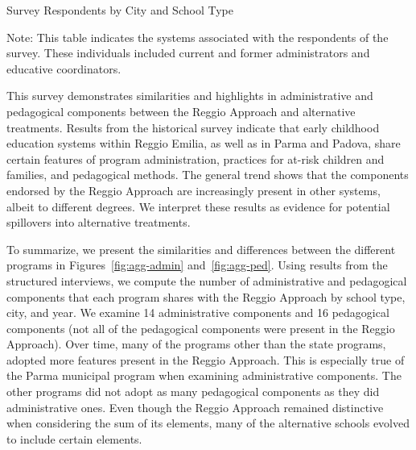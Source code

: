 \begin{table}[H]
\centering
\caption{Survey Respondents by City and School Type}\label{tab:respondents}
\begin{threeparttable}
	
\begin{tablenotes}
Note: This table indicates the systems associated with the respondents of the survey. These individuals included current and former administrators and educative coordinators.
\end{tablenotes}
\end{threeparttable}
\end{table}

This survey demonstrates similarities and highlights in administrative and pedagogical components between the Reggio Approach and alternative treatments. Results from the historical survey indicate that early childhood education systems within Reggio Emilia, as well as in Parma and Padova, share certain features of program administration, practices for at-risk children and families, and pedagogical methods. The general trend shows that the components endorsed by the Reggio Approach are increasingly present in other systems, albeit to different degrees. We interpret these results as evidence for potential spillovers into alternative treatments. 

To summarize, we present the similarities and differences between the different programs in Figures~\ref{fig:agg-admin} and~\ref{fig:agg-ped}. Using results from the structured interviews, we compute the number of administrative and pedagogical components that each program shares with the Reggio Approach by school type, city, and year. We examine 14 administrative components and 16 pedagogical components (not all of the pedagogical components were present in the Reggio Approach). Over time, many of the programs other than the state programs, adopted more features present in the Reggio Approach. This is especially true of the Parma municipal program when examining administrative components. The other programs did not adopt as many pedagogical components as they did administrative ones. Even though the Reggio Approach remained distinctive when considering the sum of its elements, many of the alternative schools evolved to include certain elements.

